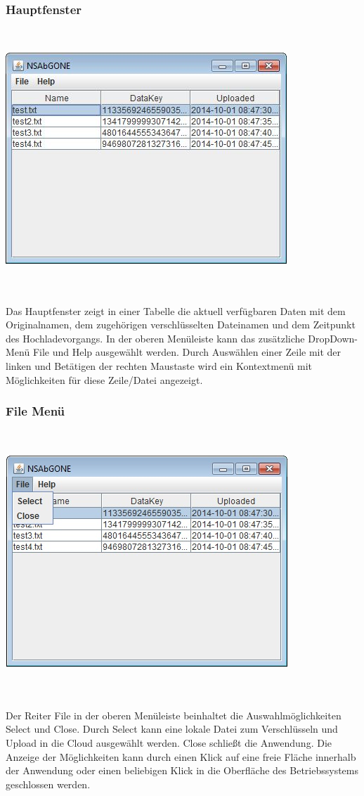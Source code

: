 \documentclass[13pt,a4paper,bibliography=totocnumbered,listof=totocnumbered]{scrartcl}
\begin{document}
\subsubsection{Hauptfenster}
$\;$\\
\begin{minipage}{\linewidth}
	\centering
	\includegraphics[width=0.4\linewidth]{./img/Main.jpg}
	\label{Main}
\end{minipage}
\\\\Das Hauptfenster zeigt in einer Tabelle die aktuell verfügbaren Daten mit dem Originalnamen, dem zugehörigen verschlüsselten Dateinamen und dem Zeitpunkt des Hochladevorgangs. In der oberen Menüleiste kann das zusätzliche DropDown-Menü File und Help ausgewählt werden. Durch Auswählen einer Zeile mit der linken und Betätigen der rechten Maustaste wird ein Kontextmenü mit Möglichkeiten für diese Zeile/Datei angezeigt.

\subsubsection{File Menü}
$\;$\\
\begin{minipage}{\linewidth}
	\centering
	\includegraphics[width=0.4\linewidth]{./img/File.jpg}
	\label{File}
\end{minipage}
\\\\Der Reiter File in der oberen Menüleiste beinhaltet die Auswahlmöglichkeiten Select und Close. Durch Select kann eine lokale Datei zum Verschlüsseln und Upload in die Cloud ausgewählt werden. Close schließt die Anwendung. Die Anzeige der Möglichkeiten kann durch einen Klick auf eine freie Fläche innerhalb der Anwendung oder einen beliebigen Klick in die Oberfläche des Betriebssystems geschlossen werden.
\end{document}
